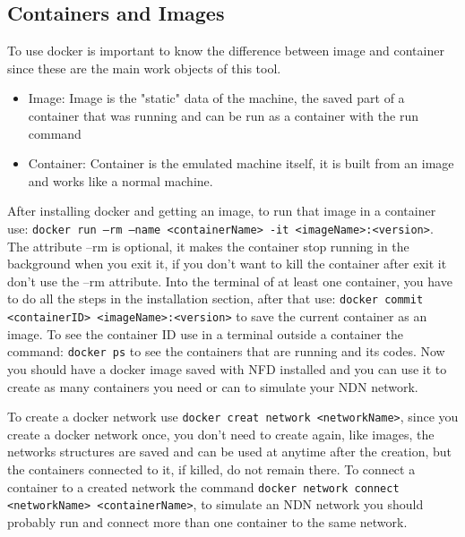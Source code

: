 \documentclass[10pt,letterpaper,extrafontsizes]{memoir}
\begin{document}
\subsection{Containers and Images}
To use docker is important to know the difference between image and container since these are the main work objects of this tool.
\begin{itemize}
 \item Image: Image is the "static" data of the machine, the saved part of a container that was running and can be run as a container with the run command
 \item Container: Container is the emulated machine itself, it is built from an image and works like a normal machine.
\end{itemize}

After installing docker and getting an image, to run that image in a container use: \texttt{docker run --rm --name <containerName> -it <imageName>:<version>}. The attribute --rm is optional, it makes the container stop running in the background when you exit it, if you don't want to kill the container after exit it don't use the --rm attribute.
Into the terminal of at least one container, you have to do all the steps in the installation section, after that use:  \texttt{docker commit <containerID>  <imageName>:<version>}  to save the current container as an image. 
To see the container ID use in a terminal outside a container the command: \texttt{docker ps} to see the containers that are running and its codes.
Now you should have a docker image saved with NFD installed and you can use it to create as many containers you need or can to simulate your NDN network.\par 
To create a docker network use \texttt{docker creat network <networkName>}, since you create a docker network once, you don't need to create again, like images, the networks structures are saved and can be used at anytime after the creation, but the containers connected to it, if killed, do not remain there.
To connect a container to a created network the command \texttt{docker network connect <networkName> <containerName>}, to simulate an NDN network you should probably run and connect more than one container to the same network.
\end{document}
